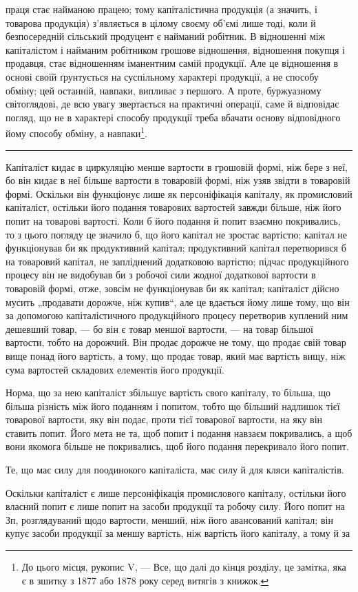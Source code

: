 \parcont{}  %
праця стає найманою працею; тому капіталістична продукція (а значить,
і товарова продукція) з’являється в цілому своєму об’ємі лише тоді,
коли й безпосередній сільський продуцент є найманий робітник. В відношенні
між капіталістом і найманим робітником грошове відношення, відношення покупця і продавця, стає
відношенням іманентним самій продукції. Але це відношення в основі своїй ґрунтується на суспільному
характері продукції, а не способу обміну; цей останній, навпаки, випливає з першого.
А проте, буржуазному світоглядові, де всю увагу звертається на практичні
операції, саме й відповідає погляд, що не в характері способу продукції
треба вбачати основу відповідного йому способу обміну, а навпаки\footnote{
До цього місця, рукопис V, — Все, що далі до кінця розділу, це замітка, яка є в зшитку з 1877 або
1878 року серед витягів з книжок.
}.

\pfbreak{}

\label{original-76}
Капіталіст кидає в циркуляцію менше вартости в грошовій формі,
ніж бере з неї, бо він кидає в неї більше вартости в товаровій формі,
ніж узяв звідти в товаровій формі. Оскільки він функціонує лише як персоніфікація
капіталу, як промисловий капіталіст, остільки його подання
товарових вартостей завжди більше, ніж його попит на товарові вартості.
Коли б його подання й попит взаємно покривались, то з цього погляду
це значило б, що його капітал не зростає вартістю; капітал не функціонував
би як продуктивний капітал; продуктивний капітал перетворився б
на товаровий капітал, не запліднений додатковою вартістю; підчас продукційного
процесу він не видобував би з робочої сили жодної додаткової
вартости в товаровій формі, отже, зовсім не функціонував би як
капітал; капіталіст дійсно мусить „продавати дорожче, ніж купив“, але
це вдається йому лише тому, що він за допомогою капіталістичного
продукційного процесу перетворив куплений ним дешевший товар, — бо він
є товар меншої вартости, — на товар більшої вартости, тобто на дорожчий.
Він продає дорожче не тому, що продає свій товар вище понад його
вартість, а тому, що продає товар, який має вартість вищу, ніж сума
вартостей складових елементів його продукції.

Норма, що за нею капіталіст збільшує вартість свого капіталу, то більша,
що більша різність між його поданням і попитом, тобто що більший
надлишок тієї товарової вартости, яку він подає, проти тієї товарової
вартости, на яку він ставить попит. Його мета не та, щоб попит і
подання навзаєм покривались, а щоб вони якомога більше не покривались,
щоб його подання перекривало його попит.

Те, що має силу для поодинокого капіталіста, має силу й для кляси
капіталістів.

Оскільки капіталіст є лише персоніфікація промислового капіталу,
остільки його власний попит є лише попит на засоби продукції та
робочу силу. Його попит на $Зп$, розглядуваний щодо вартости,
менший, ніж його авансований капітал; він купує засоби продукції
за меншу вартість, ніж вартість його капіталу, а тому й за
\parbreak{}  %
